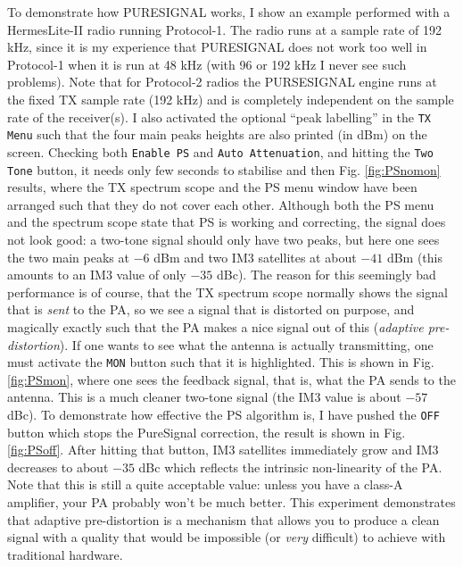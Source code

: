 \documentclass[12pt]{book}
\def\rett#1{\texttt{\color{red}#1}}
\def\bltt#1{\texttt{\color{blue}#1}}
\begin{document}
To demonstrate how PURESIGNAL works, I show an example performed with a Hermes\-Lite-II
radio running Protocol-1. The radio runs at a sample rate of 192 kHz, since it is my
experience that PURESIGNAL does not work too well in Protocol-1 when it is run
at 48 kHz (with 96 or 192 kHz I never see such problems). Note that for Protocol-2 radios
the PURSESIGNAL engine runs at the fixed TX sample rate (192 kHz) and is completely independent
on the sample rate of the receiver(s).
I also activated the optional ``peak labelling''
in the \bltt{TX Menu} such that the four main peaks heights are also printed
(in dBm) on the screen. Checking both \rett{Enable PS} and
\rett{Auto Attenuation}, and hitting the \rett{Two Tone} button, it needs only few
seconds to stabilise and then Fig. \ref{fig:PSnomon} results, where the TX
spectrum scope and the PS menu window have been arranged such that they do
not cover each other. Although both the PS menu and the spectrum scope state
that PS is working and correcting, the signal does not look good: a two-tone
signal should only have two peaks, but here one sees the two main peaks at $-6$ dBm
and two IM3 satellites at about $-41$ dBm (this amounts to an IM3 value of only $-35$ dBc).
The reason for this seemingly bad performance is of course, that the TX spectrum scope
normally shows the signal that is \textit{sent} to the PA, so we see a signal that
is distorted on purpose, and magically
exactly such that the PA makes a nice signal
out of this (\textit{adaptive pre-distortion}). If one wants to see what the antenna
is actually transmitting, one must
activate the \rett{MON} button such that it is highlighted.
This is shown in Fig. \ref{fig:PSmon}, where one sees the
feedback signal, that is, what the PA sends to the antenna.
This is a much cleaner two-tone signal (the IM3 value is about $-57$ dBc).
To demonstrate how effective the PS algorithm is,
I have pushed the \rett{OFF} button which stops the PureSignal correction, the result
is shown in Fig. \ref{fig:PSoff}. After hitting that button, IM3 satellites immediately
grow and IM3 decreases to
about $-35$ dBc which reflects the intrinsic
non-linearity of the PA.
Note that this is still a quite acceptable value:
unless you have a class-A amplifier, your PA probably won't be much better.
This experiment demonstrates that adaptive pre-distortion is a mechanism that allows you to produce a clean
signal with a quality that would be impossible (or \textit{very} difficult) to achieve
with traditional hardware.

\end{document}

